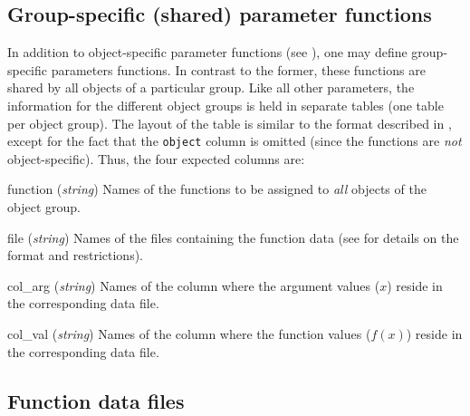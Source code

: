 \subsection{Group-specific (shared) parameter functions} \label{sec:input-sharedParamFun}

In addition to object-specific parameter functions (see ), one may define group-specific parameters functions. In contrast to the former, these functions are shared by all objects of a particular group. Like all other parameters, the information for the different object groups is held in separate tables (one table per object group). The layout of the table is similar to the format described in , except for the fact that the \verb!object! column is omitted (since the functions are \emph{not} object-specific). Thus, the four expected columns are:

\begin{columndef}
  \item [function] (\textit{string}) Names of the functions to be assigned to \emph{all} objects of the object group.
  \item [file] (\textit{string}) Names of the files containing the function data (see  for details on the format and restrictions).
  \item [col\_arg] (\textit{string}) Names of the column where the argument values ($x$) reside in the corresponding data file.
  \item [col\_val] (\textit{string}) Names of the column where the function values ($f(x)$) reside in the corresponding data file.
\end{columndef}

\subsection{Function data files} \label{sec:input-functions}

